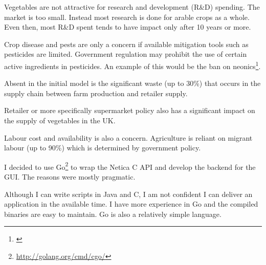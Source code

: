 \documentclass[12pt,notitlepage]{article}
\begin{document}
\begin{multicols}{2}
Vegetables are not attractive for research and development (R\&D) spending. The market is too small. Instead most research is done for arable crops as a whole. Even then, most R\&D spent tends to have impact only after 10 years or more.

Crop disease and pests are only a concern if available mitigation tools such as pesticides are limited. Government regulation may prohibit the use of certain active ingredients in pesticides. An example of this would be the ban on neonics\footnote{\cite{bbc2016}}.

Absent in the initial model is the significant waste (up to 30\%) that occurs in the supply chain between farm production and retailer supply.

Retailer or more specifically supermarket policy also has a significant impact on the supply of vegetables in the UK.

Labour cost and availability is also a concern. Agriculture is reliant on migrant labour (up to 90\%) which is determined by government policy.

I decided to use Go\footnote{\url{http://golang.org/cmd/cgo/}} to wrap the Netica C API and develop the backend for the GUI. The reasons were mostly pragmatic.

Although I can write scripts in Java and C, I am not confident I can deliver an application in the available time. I have more experience in Go and the compiled binaries are easy to maintain. Go is also a relatively simple language.
\end{multicols}
\end{document}
